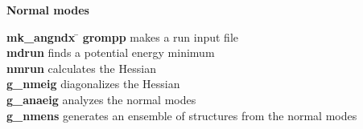 \begin{description}
\item {\large\bf Normal modes}
\begin{tabbing}
{\bf mk\_angndx} \= \kill
{\bf grompp} \> makes a run input file \\
{\bf mdrun} \> finds a potential energy minimum \\
{\bf nmrun} \> calculates the Hessian \\
{\bf g\_nmeig} \> diagonalizes the Hessian  \\
{\bf g\_anaeig} \> analyzes the normal modes \\
{\bf g\_nmens} \> generates an ensemble of structures from the normal modes \\
\end{tabbing}

\end{description}
